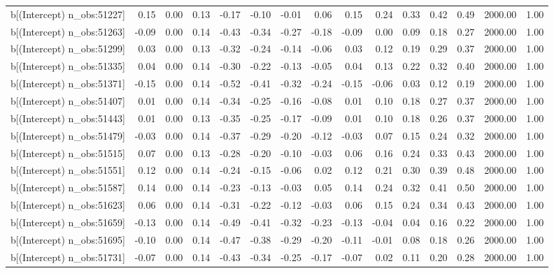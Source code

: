 \begin{table}[ht]
\begin{tabular}{rrrrrrrrrrrrrrr}
  b[(Intercept) n\_obs:51227] & 0.15 & 0.00 & 0.13 & -0.17 & -0.10 & -0.01 & 0.06 & 0.15 & 0.24 & 0.33 & 0.42 & 0.49 & 2000.00 & 1.00 \\ 
  b[(Intercept) n\_obs:51263] & -0.09 & 0.00 & 0.14 & -0.43 & -0.34 & -0.27 & -0.18 & -0.09 & 0.00 & 0.09 & 0.18 & 0.27 & 2000.00 & 1.00 \\ 
  b[(Intercept) n\_obs:51299] & 0.03 & 0.00 & 0.13 & -0.32 & -0.24 & -0.14 & -0.06 & 0.03 & 0.12 & 0.19 & 0.29 & 0.37 & 2000.00 & 1.00 \\ 
  b[(Intercept) n\_obs:51335] & 0.04 & 0.00 & 0.14 & -0.30 & -0.22 & -0.13 & -0.05 & 0.04 & 0.13 & 0.22 & 0.32 & 0.40 & 2000.00 & 1.00 \\ 
  b[(Intercept) n\_obs:51371] & -0.15 & 0.00 & 0.14 & -0.52 & -0.41 & -0.32 & -0.24 & -0.15 & -0.06 & 0.03 & 0.12 & 0.19 & 2000.00 & 1.00 \\ 
  b[(Intercept) n\_obs:51407] & 0.01 & 0.00 & 0.14 & -0.34 & -0.25 & -0.16 & -0.08 & 0.01 & 0.10 & 0.18 & 0.27 & 0.37 & 2000.00 & 1.00 \\ 
  b[(Intercept) n\_obs:51443] & 0.01 & 0.00 & 0.13 & -0.35 & -0.25 & -0.17 & -0.09 & 0.01 & 0.10 & 0.18 & 0.26 & 0.37 & 2000.00 & 1.00 \\ 
  b[(Intercept) n\_obs:51479] & -0.03 & 0.00 & 0.14 & -0.37 & -0.29 & -0.20 & -0.12 & -0.03 & 0.07 & 0.15 & 0.24 & 0.32 & 2000.00 & 1.00 \\ 
  b[(Intercept) n\_obs:51515] & 0.07 & 0.00 & 0.13 & -0.28 & -0.20 & -0.10 & -0.03 & 0.06 & 0.16 & 0.24 & 0.33 & 0.43 & 2000.00 & 1.00 \\ 
  b[(Intercept) n\_obs:51551] & 0.12 & 0.00 & 0.14 & -0.24 & -0.15 & -0.06 & 0.02 & 0.12 & 0.21 & 0.30 & 0.39 & 0.48 & 2000.00 & 1.00 \\ 
  b[(Intercept) n\_obs:51587] & 0.14 & 0.00 & 0.14 & -0.23 & -0.13 & -0.03 & 0.05 & 0.14 & 0.24 & 0.32 & 0.41 & 0.50 & 2000.00 & 1.00 \\ 
  b[(Intercept) n\_obs:51623] & 0.06 & 0.00 & 0.14 & -0.31 & -0.22 & -0.12 & -0.03 & 0.06 & 0.15 & 0.24 & 0.34 & 0.43 & 2000.00 & 1.00 \\ 
  b[(Intercept) n\_obs:51659] & -0.13 & 0.00 & 0.14 & -0.49 & -0.41 & -0.32 & -0.23 & -0.13 & -0.04 & 0.04 & 0.16 & 0.22 & 2000.00 & 1.00 \\ 
  b[(Intercept) n\_obs:51695] & -0.10 & 0.00 & 0.14 & -0.47 & -0.38 & -0.29 & -0.20 & -0.11 & -0.01 & 0.08 & 0.18 & 0.26 & 2000.00 & 1.00 \\ 
  b[(Intercept) n\_obs:51731] & -0.07 & 0.00 & 0.14 & -0.43 & -0.34 & -0.25 & -0.17 & -0.07 & 0.02 & 0.11 & 0.20 & 0.28 & 2000.00 & 1.00 \\ 

\end{tabular}
\end{table}
